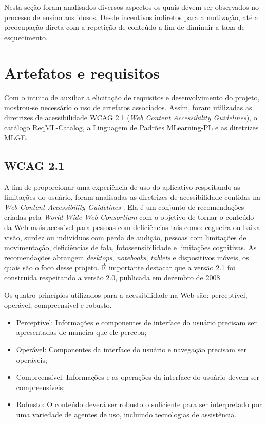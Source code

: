 Nesta seção foram analisados diversos aspectos os quais devem ser observados no processo de ensino aos idosos. Desde incentivos indiretos para a motivação, até a preocupação direta com a repetição de conteúdo a fim de diminuir a taxa de esquecimento. 

\section{Artefatos e requisitos}
\label{subsec:artefatos}
Com o intuito de auxiliar a elicitação de requisitos e desenvolvimento do projeto, mostrou-se necessário o uso de artefatos associados.
Assim, foram utilizadas as diretrizes de acessibilidade WCAG 2.1 (\textit{Web Content Accessibility Guidelines}), o catálogo ReqML-Catalog, a Linguagem de Padrões MLearning-PL e as diretrizes MLGE.

\subsection{WCAG 2.1}
A fim de proporcionar uma experiência de uso do aplicativo respeitando as limitações do usuário, foram analisadas as diretrizes de acessibilidade contidas na \textit{Web Content Accessibility Guidelines} \citep{wcag}. Ela é um conjunto de recomendações criadas pela
\textit{World Wide Web Consortium} \citep{w3c} com o objetivo de tornar o conteúdo da Web mais acessível para pessoas com deficiências tais como: cegueira ou baixa visão, surdez ou indivíduos com perda de audição, pessoas com limitações de movimentação, deficiências de fala, fotossensibilidade e limitações cognitivas. As recomendações abrangem \textit{desktops}, \textit{notebooks}, \textit{tablets} e dispositivos móveis, os quais são o foco desse projeto. É importante destacar que a versão 2.1 foi construída respeitando a versão 2.0, publicada em dezembro de 2008. %

Os quatro princípios utilizados para a acessibilidade na Web são: perceptível, operável, compreensível e robusto.
\begin{itemize}
    \item Perceptível: Informações e componentes de interface do usuário precisam ser apresentadas de maneira que ele perceba;
    \item Operável: Componentes da interface do usuário e navegação precisam ser operáveis;
    \item Compreensível: Informações e as operações da interface do usuário devem ser compreensíveis;
    \item Robusto: O conteúdo deverá ser robusto o suficiente para ser interpretado por uma variedade de agentes de uso, incluindo tecnologias de assistência.
\end{itemize}

